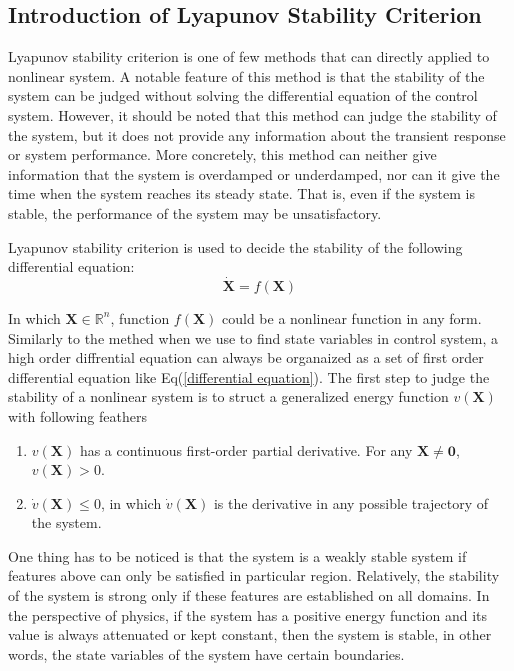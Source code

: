 \documentclass[a4paper]{article}
\begin{document}
\subsection{Introduction of Lyapunov Stability Criterion}

Lyapunov stability criterion is one of few methods that can directly applied to nonlinear system. A notable feature of this method is that the stability of the system can be judged without solving the differential equation of the control system. However, it should be noted that this method can judge the stability of the system, but it does not provide any information about the transient response or system performance. More concretely, this method can neither give information that the system is overdamped or underdamped, nor can it give the time when the system reaches its steady state. That is, even if the system is stable, the performance of the system may be unsatisfactory. 

Lyapunov stability criterion is used to decide the stability of the following differential equation\cite{ref2}:
\begin{equation}
\boldsymbol{\dot{X}} = f(\boldsymbol{X})
\label{differential equation}   
\end{equation}

In which $\boldsymbol{X}\in \mathbb{R}^n$, function $f(\boldsymbol{X})$ could be a nonlinear function in any form. Similarly to the methed when we use to find state variables in control system, a high order diffrential equation can always be organaized as a set of first order differential equation like Eq(\ref{differential equation}). The first step to judge the stability of a nonlinear system is to struct a generalized energy function $v(\boldsymbol{X})$ with following feathers
\begin{enumerate}
   \item $v(\boldsymbol{X})$  has a continuous first-order partial derivative. For any $\boldsymbol{X}\neq \boldsymbol{0}$, $v(\boldsymbol{X}) > 0 $.
   \item $\dot{v}(\boldsymbol{X})\leq 0$, in which $\dot{v}(\boldsymbol{X})$ is the derivative in any possible trajectory of the system.
\end{enumerate}
 
One thing has to be noticed is that the system is a weakly stable system if features above can only be satisfied in particular region. Relatively, the stability of the system is strong only if these features are established on all domains. In the perspective of physics, if the system has a positive energy function and its value is always attenuated or kept constant, then the system is stable, in other words, the state variables of the system have certain boundaries. 
\end{document}
